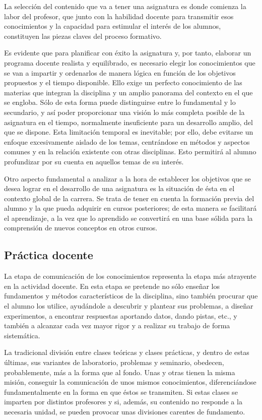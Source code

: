 La selección del contenido que va a tener una asignatura es donde comienza la labor del profesor, que junto con la habilidad docente para transmitir esos conocimientos y la capacidad para estimular el interés de los alumnos, constituyen las piezas claves del proceso formativo.

Es evidente que para planificar con éxito la asignatura y, por tanto, elaborar un programa docente realista y equilibrado, es necesario elegir los conocimientos que se van a impartir y ordenarlos de manera lógica en función de los objetivos propuestos y el tiempo disponible. Ello exige un perfecto conocimiento de las materias que integran la disciplina y un amplio panorama del contexto en el que se engloba. Sólo de esta forma puede distinguirse entre lo fundamental y lo secundario, y así poder proporcionar una visión lo más completa posible de la asignatura en el tiempo, normalmente insuficiente para un desarrollo amplio, del que se dispone. Esta limitación temporal es inevitable; por ello, debe evitarse un enfoque excesivamente aislado de los temas, centrándose en métodos y aspectos comunes y en la relación existente con otras disciplinas. Esto permitirá al alumno profundizar por su cuenta en aquellos temas de su interés.

Otro aspecto fundamental a analizar a la hora de establecer los objetivos que se desea lograr en el desarrollo de una asignatura es la situación de ésta en el contexto global de la carrera. Se trata de tener en cuenta la formación previa del alumno y la que pueda adquirir en cursos posteriores; de esta manera se facilitará el aprendizaje, a la vez que lo aprendido se convertirá en una base sólida para la comprensión de nuevos conceptos en otros cursos.

\subsection{Práctica docente} \label{sec:practica_docente}

La etapa de comunicación de los conocimientos representa la etapa más atrayente en la actividad docente. En esta etapa se pretende no sólo enseñar los fundamentos y métodos característicos de la disciplina, sino también procurar que el alumno los utilice, ayudándole a descubrir y plantear sus problemas, a diseñar experimentos, a encontrar respuestas aportando datos, dando pistas, etc., y también a alcanzar cada vez mayor rigor y a realizar su trabajo de forma sistemática.

La tradicional división entre clases teóricas y clases prácticas, y dentro de estas últimas, sus variantes de laboratorio, problemas y seminario, obedecen, probablemente, más a la forma que al fondo. Unas y otras tienen la misma misión, conseguir la comunicación de unos mismos conocimientos, diferenciándose fundamentalmente en la forma en que éstos se transmiten. Si estas clases se imparten por distintos profesores y si, además, su contenido no responde a la necesaria unidad, se pueden provocar unas divisiones carentes de fundamento.


